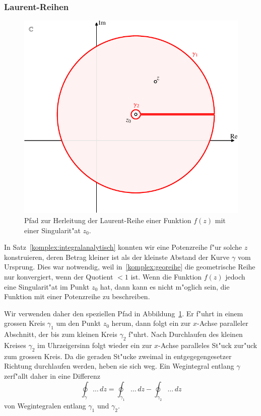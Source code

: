 \subsubsection{Laurent-Reihen}
\label{sssec:LaurentReihen}
\begin{figure}
\centering
\includegraphics{chapters/images/komplex-3.pdf}
\caption{Pfad zur Herleitung der Laurent-Reihe einer Funktion $f(z)$
mit einer Singularit"at $z_0$.
\label{komplex:laurentpfad}}
\end{figure}%
%
In Satz~\ref{komplex:integralanalytisch} konnten wir eine Potenzreihe f"ur
solche $z$ konstruieren, deren Betrag kleiner ist als der kleinste Abstand
der Kurve $\gamma$ vom Ursprung.
Dies war notwendig, weil in~\eqref{komplex:georeihe} die geometrische Reihe
nur konvergiert, wenn der Quotient $<1$ ist.
Wenn die Funktion $f(z)$ jedoch eine Singularit"at im Punkt $z_0$ hat, dann
kann es nicht m"oglich sein, die Funktion mit einer Potenzreihe zu
beschreiben.

Wir verwenden daher den speziellen Pfad in Abbildung~\ref{komplex:laurentpfad}.
Er f"uhrt in einem grossen Kreis $\gamma_1$ um den Punkt $z_0$ herum,
dann folgt ein zur $x$-Achse paralleler Abschnitt, der bis zum kleinen
Kreis $\gamma_2$ f"uhrt.
Nach Durchlaufen des kleinen Kreises $\gamma_2$ im Uhrzeigersinn folgt wieder
ein zur $x$-Achse paralleles St"uck zur"uck zum grossen Kreis.
Da die geraden St"ucke zweimal in entgegegengesetzer Richtung durchlaufen
werden, heben sie sich weg.
Ein Wegintegral entlang $\gamma$ zerf"allt daher in eine Differenz
\[
\oint_\gamma\dots\,dz
=
\oint_{\gamma_1}\dots\,dz
-
\oint_{\gamma_2}\dots\,dz
\]
von Wegintegralen entlang $\gamma_1$ und $\gamma_2$.

